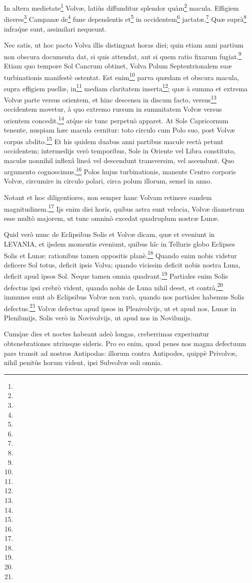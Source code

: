 \documentclass[a4paper, 11pt, oneside, polutonikogreek, german]{article}
\begin{document}
In altera medietate\footnote{} Volvæ, latiùs diffunditur splendor quàm\footnote{} macula. Effigiem diceres\footnote{} Campanæ de\footnote{} fune dependentis et\footnote{} in occidentem\footnote{} jactatæ.\footnote{} Quæ suprà\footnote{} infra\'que sunt, assimilari nequeunt.

Nec satis, ut hoc pacto Volva illis distinguat horas diei; quin etiam anni partium non obscura documenta dat, si quis attendat, aut si quem ratio fixarum fugiat.\footnote{} Etiam quo tempore Sol Cancrum obtinet, Volva Polum Septentrionalem suæ turbinationis manifestè ostentat. Est enim\footnote{} parva quædam et obscura macula, supra effigiem puellæ, in\footnote{} mediam claritatem inserta\footnote{}; quæ à summa et extrema Volvæ parte versus orientem, et hinc descensu in discum facto, versus\footnote{} occidentem movetur, à quo extremo rursum in summitatem Volvæ versus orientem concedit,\footnote{} at\'que sic tunc perpetuò apparet. At Sole Capricornum tenente, nuspiam hæc macula cernitur: toto circulo cum Polo suo, post Volvæ corpus abdito.\footnote{} Et his quidem duabus anni partibus macule rectà petunt occidentem; intermedijs verò temporibus, Sole in Oriente vel Libra constituto, maculæ nonnihil inflexâ lineâ vel descendunt transversim, vel ascendunt. Quo argumento cognoscimus,\footnote{} Polos hujus turbinationis, manente Centro corporis Volvæ, circumire in circulo polari, circa polum illorum, semel in anno.

Notant et hoc diligentiores, non semper hanc Volvam retinere eandem magnitudinem.\footnote{} Ijs enim diei horis, quibus astra sunt velocia, Volvæ diametrum esse multò majorem, ut tunc omninò excedat quadruplum nostræ Lunæ.

Quid verò nunc de Eclipsibus Solis et Volvæ dicam, quæ et eveniunt in LEVANIA, et ijsdem momentis eveniunt, quibus hîc in Telluris globo Eclipses Solis et Lunæ: rationibus tamen oppositis planè.\footnote{} Quando enim nobis videtur deficere Sol totus, deficit ipsis Volva; quando vicissim deficit nobis nostra Luna, deficit apud ipsos Sol. Neque tamen omnia quadrant.\footnote{} Partiales enim Solis defectus ipsi crebrò vident, quando nobis de Luna nihil deest, et contrà,\footnote{} immunes sunt ab Eclipsibus Volvæ non rarò, quando nos partiales habemus Solis defectus.\footnote{} Volvæ defectus apud ipsos in Plenivolvijs, ut et apud nos, Lunæ in Plenilunijs, Solis verò in Novivolvijs, ut apud nos in Novilunijs.

Cum\'que dies et noctes habeant adeò longas, creberrimas experiuntur obtenebrationes utriusque sideris. Pro eo enim, quod penes nos magna defectuum pars transit ad nostros Antipodas: illorum contra Antipodes, quippè Privolvæ, nihil penitùs horum vident, ipsi Subvolvæ soli omnia.
\end{document}
